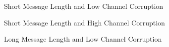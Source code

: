\documentclass[10pt,twocolumn,letterpaper]{article}
\begin{document}
\begin{figure}[t]
\begin{center}
\end{center}
   \caption{Short Message Length and Low Channel Corruption}
\end{figure}


\begin{figure}[t]
\begin{center}
\end{center}
   \caption{Short Message Length and High Channel Corruption}
\end{figure}


\begin{figure}[t]
\begin{center}
\end{center}
   \caption{Long Message Length and Low Channel Corruption}
\end{figure}
\end{document}

